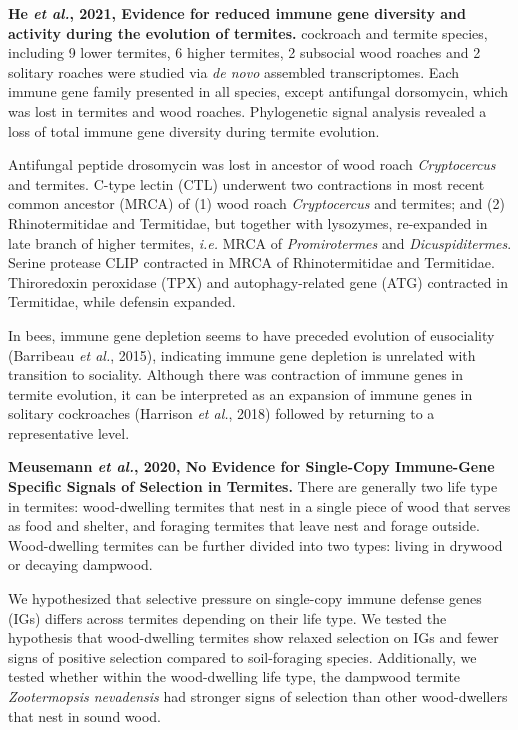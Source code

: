 \documentclass[11pt]{article}
\begin{document}
\begin{sloppypar}
\textbf{He \textit{et al.}, 2021, Evidence for reduced immune gene diversity and activity during the evolution of termites.}  cockroach and termite species, including 9 lower termites, 6 higher termites, 2 subsocial wood roaches and 2 solitary roaches were studied via \textit{de novo} assembled transcriptomes. 
Each immune gene family presented in all species, except antifungal dorsomycin, which was lost in termites and wood roaches. 
Phylogenetic signal analysis revealed a loss of total immune gene diversity during termite evolution. 
\par
Antifungal peptide drosomycin was lost in ancestor of wood roach \textit{Cryptocercus} and termites. 
C-type lectin (CTL) underwent two contractions in most recent common ancestor (MRCA) of (1) wood roach \textit{Cryptocercus} and termites; and (2) Rhinotermitidae and Termitidae, but together with lysozymes, re-expanded in late branch of higher termites, \textit{i.e.} MRCA of \textit{Promirotermes} and \textit{Dicuspiditermes}. 
Serine protease CLIP contracted in MRCA of Rhinotermitidae and Termitidae. 
Thiroredoxin peroxidase (TPX) and autophagy-related gene (ATG) contracted in Termitidae, while defensin expanded. 
\par
In bees, immune gene depletion seems to have preceded evolution of eusociality (Barribeau \textit{et al.}, 2015), indicating immune gene depletion is unrelated with transition to sociality. 
Although there was contraction of immune genes in termite evolution, it can be interpreted as an expansion of immune genes in solitary cockroaches (Harrison \textit{et al.}, 2018) followed by returning to a representative level.
\par
\textbf{Meusemann \textit{et al.}, 2020, No Evidence for Single-Copy Immune-Gene Specific Signals of Selection in Termites.} \newline
There are generally two life type in termites: wood-dwelling termites that nest in a single piece of wood that serves as food and shelter, and foraging termites that leave nest and forage outside. 
Wood-dwelling termites can be further divided into two types: living in drywood or decaying dampwood. 
\par
We hypothesized that selective pressure on single-copy immune defense genes (IGs) differs across termites depending on their life type. 
We tested the hypothesis that wood-dwelling termites show relaxed selection on IGs and fewer signs of positive selection compared to soil-foraging species. 
Additionally, we tested whether within the wood-dwelling life type, the dampwood termite \textit{Zootermopsis nevadensis} had stronger signs of selection than other wood-dwellers that nest in sound wood.

\end{sloppypar}
\end{document}
